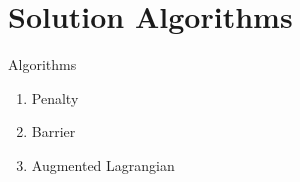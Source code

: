 \documentclass[aspectratio=169,xcolor=dvipsnames,11pt]{beamer}
\begin{document}
\section{Solution Algorithms}\label{sec:algorithms}
\begin{frame}{Algorithms}
    \begin{enumerate}
        \item Penalty
        \item Barrier
        \item Augmented Lagrangian
    \end{enumerate}
\end{frame}


    
    
    
    
    
    
    
    
    
    
    
    
    
\end{document}
